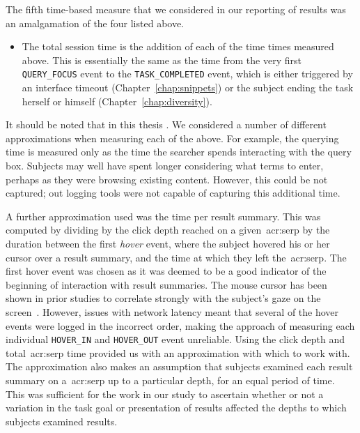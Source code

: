 The fifth time-based measure that we considered in our reporting of results was an amalgamation of the four listed above.

\begin{itemize}
    \item{ The total session time is the addition of each of the time times measured above. This is essentially the same as the time from the very first \texttt{QUERY\_FOCUS} event to the \texttt{TASK\_COMPLETED} event, which is either triggered by an interface timeout (Chapter~\ref{chap:snippets}) or the subject ending the task herself or himself (Chapter~\ref{chap:diversity}).}
    
\end{itemize}

It should be noted that in this thesis . We considered a number of different approximations when measuring each of the above. For example, the querying time is measured only as the time the searcher spends interacting with the query box. Subjects may well have spent longer considering what terms to enter, perhaps as they were browsing existing content. However, this could be not captured; out logging tools were not capable of capturing this additional time.

A further approximation used was the time per result summary. This was computed by dividing by the click depth reached on a given~\gls{acr:serp} by the duration between the first \emph{hover} event, where the subject hovered his or her cursor over a result summary, and the time at which they left the~\gls{acr:serp}. The first hover event was chosen as it was deemed to be a good indicator of the beginning of interaction with result summaries. The mouse cursor has been shown in prior studies to correlate strongly with the subject's gaze on the screen~\citep{chen2001mouse_cursor, smucker2014judging_relevance_movements}. However, issues with network latency meant that several of the hover events were logged in the incorrect order, making the approach of measuring each individual \texttt{HOVER\_IN} and \texttt{HOVER\_OUT} event unreliable. Using the click depth and total~\gls{acr:serp} time provided us with an approximation with which to work with. The approximation also makes an assumption that subjects examined each result summary on a~\gls{acr:serp} up to a particular depth, for an equal period of time. This was sufficient for the work in our study to ascertain whether or not a variation in the task goal or presentation of results affected the depths to which subjects examined results.

